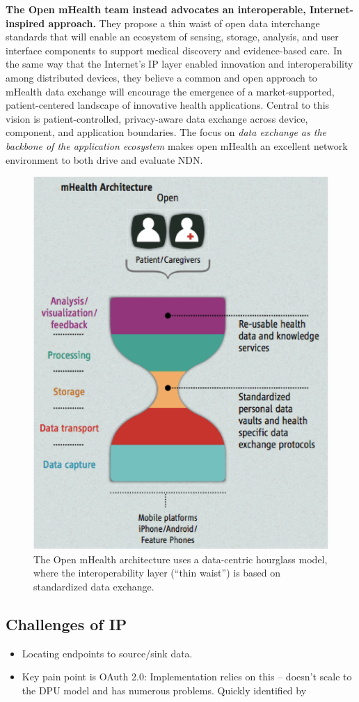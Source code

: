 \textbf{The Open mHealth team instead advocates an interoperable,  Internet-inspired
approach.} They propose a thin waist of open data interchange standards
that will enable an ecosystem of sensing, storage, analysis, and user
interface components to support medical
discovery and evidence-based care.  In the same way that the Internet's
IP layer enabled innovation and interoperability among distributed
devices, they believe a common and open approach to mHealth data exchange
will  encourage the emergence of a market-supported, patient-centered
landscape of innovative health applications. Central to this vision is
patient-controlled, privacy-aware data exchange across device, component,
and application boundaries.  The focus on \emph{data exchange as the
backbone of the application ecosystem} makes open mHealth an excellent
network environment to both drive and evaluate NDN.

\begin{figure}
\begin{center}
\includegraphics[width=.4\textwidth]{figures/mHealth-hourglass}
\caption{The Open mHealth architecture uses a data-centric hourglass model, where the interoperability layer (``thin waist'') is based on standardized data exchange.~\cite{SimEstrin2010}}
\label{fig:mHealth}
\end{center}
\end{figure}

\subsection{Challenges of IP}

\begin{itemize}
\item Locating endpoints to source/sink data.
\item Key pain point is OAuth 2.0:  Implementation relies on this – doesn’t scale to the DPU model and has numerous problems.  Quickly identified by 
\end{itemize}

